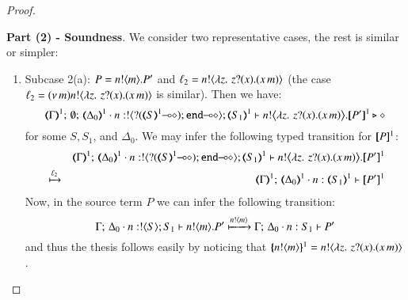 \begin{proof}
\begin{enumerate}[1.]

%
		
\end{enumerate}
%
\noi \textbf{Part (2) - Soundness}. We consider two representative cases, the rest is similar or simpler:
%
\begin{enumerate}[1.]
	\item Subcase 2(a): $P = n ! \langle m \rangle . P'$ and $\ell_2 = n ! \langle \lambda z.\,\,z ? (x) . (x\, {m}) \rangle$
	(the case $\ell_2 = (\nu\, m)n ! \langle \lambda z.\,\,z ? (x) . (x\, {m}) \rangle$ is similar).
		Then 
		we have: %
%
		\[
			\mapt{\Gamma}^{1};\, \emptyset;\, \mapt{\Delta_0}^{1} \cat 
			n: \btout{\lhot{\btinp{\lhot{\tmap{S}{1}}}\tinact}} \tmap{S_1}{1} 
			\proves 
			 \bbout{n}{ \abs{z}{\,\binp{z}{x} (\appl{x}{m})} } \pmap{P'}{1} 
			 \hastype \Proc
		\]
%
		for some $S, S_1$, and $\Delta_0$. 
		We may infer the following typed transition for $[\!\![P]\!\!]^1$:
%
		\begin{eqnarray*}
			& & \mapt{\Gamma}^{1};\, \mapt{\Delta_0}^{1} \cat n: \btout{\lhot{\btinp{\lhot{\tmap{S}{1}}}\tinact}} \tmap{S_1}{1} 
			\proves 
			 \bbout{n}{ \abs{z}{\,\binp{z}{x} (\appl{x}{m})} } \pmap{P'}{1} 
			 \\
			&\hby{\ell_2}& 
			\mapt{\Gamma}^{1};\, \mapt{\Delta_0}^{1} \cat n: \tmap{S_1}{1} 
			\proves  \pmap{P'}{1} 
		\end{eqnarray*}
%
		Now, in the source term $P$ we can infer the following transition: 
%
		\[
		\Gamma;\,  \Delta_0 \cdot n:! \langle S \rangle ; S_1 \vdash n ! \langle m \rangle . P'
		 \xmapsto{n !\langle m \rangle} 
		 \Gamma;\,  \Delta_0 \cdot n: S_1 \vdash P'
		\]
%
		and thus the thesis follows easily by noticing that 
		$\{\!\!\{n ! \langle m \rangle\}\!\!\}^{1} = n ! \langle \lambda z.\,\,z ? (x) . (x\, {m}) \rangle$.



\end{enumerate}
\end{proof}
